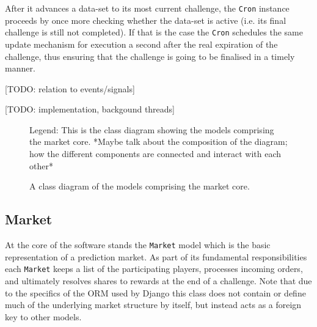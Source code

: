 \documentclass[bsc,frontabs,twoside,singlespacing,parskip,deptreport]{infthesis}     %
\begin{document}
	After it advances a data-set to its most current challenge, the {\tt Cron} instance proceeds by once more checking whether the data-set is active (i.e. its final challenge is still not completed). If that is the case the {\tt Cron} schedules the same update mechanism for execution a second after the real expiration of the challenge, thus ensuring that the challenge is going to be finalised in a timely manner. 

	[TODO: relation to events/signals]
	
	[TODO: implementation, backgound threads]

\begin{figure}
\caption{A class diagram of the models comprising the market core. }
\noindent{}
\label{fig:class-diagram}
{Legend: This is the class diagram showing the models comprising the market core. *Maybe talk about the composition of the diagram; how the different components are connected and interact with each other*}
\end{figure}

\subsection{Market}
\label{sub:market}

    At the core of the software stands the {\tt Market} model which is the basic representation of a prediction market. As part of its fundamental responsibilities each {\tt Market} keeps a list of the participating players, processes incoming orders, and ultimately resolves shares to rewards at the end of a challenge. Note that due to the specifics of the ORM used by Django this class does not contain or define much of the underlying market structure by itself, but instead acts as a foreign key to other models. 
\end{document}
